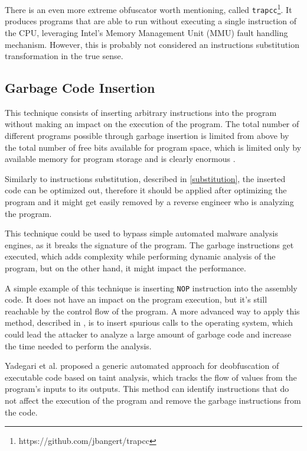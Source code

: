 \documentclass[
  digital, %
  notable,   %
  twoside, %
  nolof,     %
  nolot,     %
]{fithesis3}
\theoremstyle{definition}
\begin{document}
There is an even more extreme obfuscator worth mentioning, called \texttt{trapcc}\footnote{https://github.com/jbangert/trapcc}. It produces programs that are able to run without executing a single instruction of the CPU, leveraging Intel's Memory Management Unit (MMU) fault handling mechanism. However, this is probably not considered an instructions substitution transformation in the true sense. 

\subsection{Garbage Code Insertion} \label{garbage}
This technique consists of inserting arbitrary instructions into the program without making an impact on the execution of the program. The total number of different programs possible
through garbage insertion is limited from above by the total number of free bits available for program space, which is limited only by available memory for program storage and is clearly enormous \cite{os_protection}. 

Similarly to instructions substitution, described in \ref{substitution}, the inserted code can be optimized out, therefore it should be applied after optimizing the program and it might get easily removed by a reverse engineer who is analyzing the program. 

This technique could be used to bypass simple automated malware analysis engines, as it breaks the signature of the program. The garbage instructions get executed, which adds complexity while performing dynamic analysis of the program, but on the other hand, it might impact the performance. 

A simple example of this technique is inserting \texttt{NOP} instruction into the assembly code. It does not have an impact on the program execution, but it's still reachable by the control flow of the program. A more advanced way to apply this method, described in \cite{os_protection}, is to insert spurious calls to the operating system, which could lead the attacker to analyze a large amount of garbage code and increase the time needed to perform the analysis. 

Yadegari et al. \cite{generic_deobfuscation} proposed a generic automated approach for deobfuscation of executable code based on taint analysis, which tracks the flow of values from the program's inputs to its outputs. This method can identify instructions that do not affect the execution of the program and remove the garbage instructions from the code. 
\end{document}
